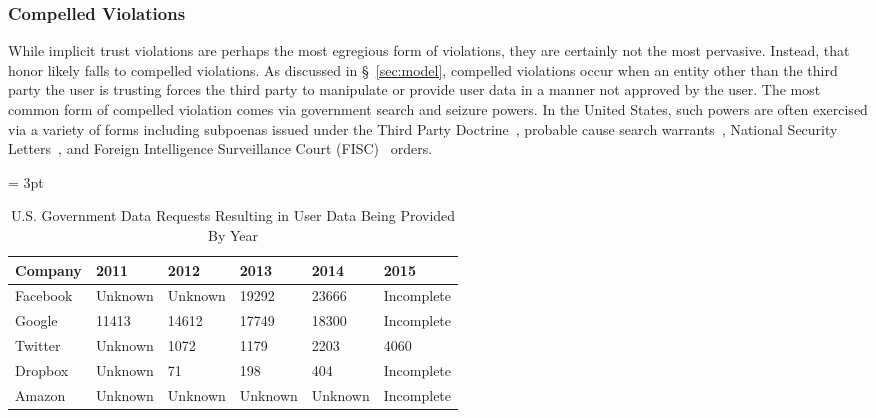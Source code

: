 \subsubsection{Compelled Violations}

While implicit trust violations are perhaps the most egregious form of
violations, they are certainly not the most pervasive. Instead, that
honor likely falls to compelled violations. As discussed in
\S~\ref{sec:model}, compelled violations occur when an entity other
than the third party the user is trusting forces the third party to
manipulate or provide user data in a manner not approved by the
user. The most common form of compelled violation comes via government
search and seizure powers. In the United States, such powers are often
exercised via a variety of forms including subpoenas issued under the
Third Party Doctrine~\cite{thompson-thirdparty}, probable cause search
warrants~\cite{us-constitution-amend4}, National Security
Letters~\cite{fbi-nsl}, and Foreign Intelligence Surveillance Court
(FISC)~\cite{fisc} orders.

\begin{table}[thb]
  \footnotesize
  \centering
  \tabulinesep = 3pt
  \begin{tabu} to \textwidth
    { | X[2,c,m]
      | X[1,c,m]
      | X[1,c,m]
      | X[1,c,m]
      | X[1,c,m]
      | X[1,c,m]
      | }
    \hline
    \textbf{Company}
    & \textbf{2011}
    & \textbf{2012}
    & \textbf{2013}
    & \textbf{2014}
    & \textbf{2015}
    \\ \hline 
    Facebook
    & Unknown
    & Unknown
    & 19292
    & 23666
    & Incomplete
    \\ \hline
    Google
    & 11413
    & 14612
    & 17749
    & 18300
    & Incomplete
    \\ \hline
    Twitter
    & Unknown
    & 1072
    & 1179
    & 2203
    & 4060
    \\ \hline 
    Dropbox
    & Unknown
    & 71
    & 198
    & 404
    & Incomplete
    \\ \hline 
    Amazon
    & Unknown
    & Unknown
    & Unknown
    & Unknown
    & Incomplete
    \\ \hline 
 \end{tabu}
  \caption{ U.S. Government Data Requests Resulting in User Data Being
    Provided By Year }
  \label{tab:analysis:violations:reports}
\end{table}

